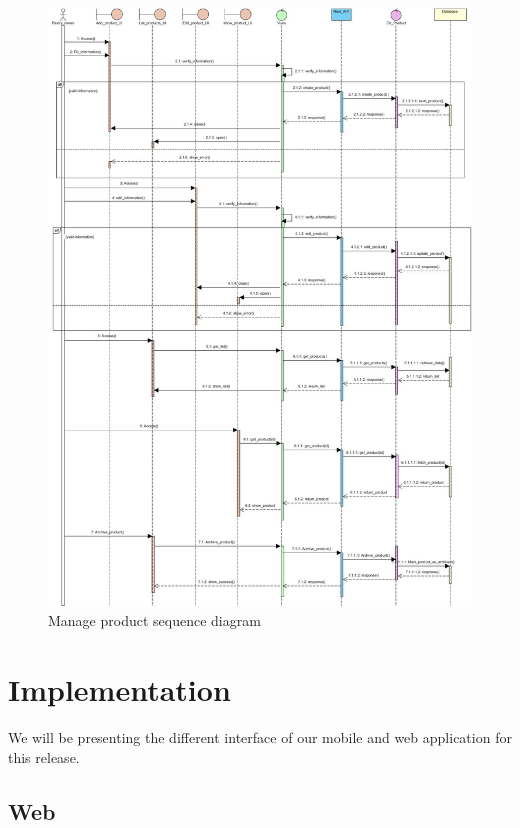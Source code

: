 \documentclass[12pt,a4paper]{report}
\begin{document}
\begin{figure}[H]
	\centering
	\includegraphics[width=6.7in,keepaspectratio]{manageproduct.jpg}
	\caption{Manage product sequence diagram}
	\label{product-sequence}
\end{figure}
\section{Implementation}
	We will be presenting the different interface of our mobile and web application for this release.\par
\subsection{Web}
\end{document}
